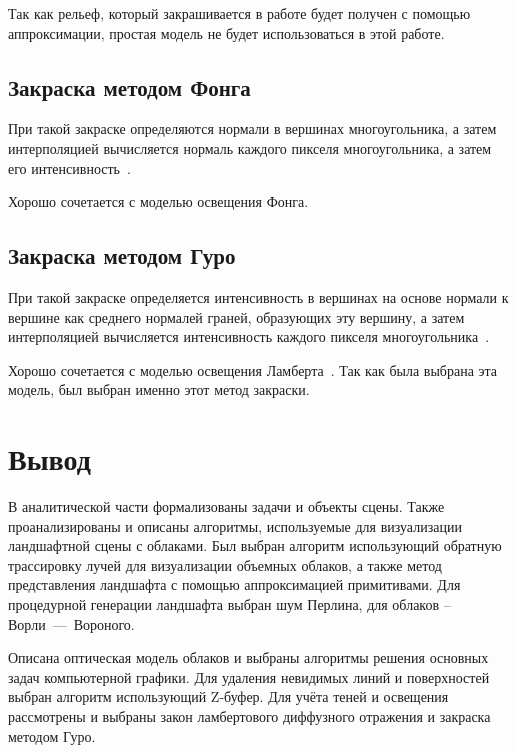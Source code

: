 Так как рельеф, который закрашивается в работе будет получен с помощью аппроксимации, простая модель не будет использоваться в этой работе.

\subsection{Закраска методом Фонга}
При такой закраске определяются нормали в вершинах многоугольника, а затем интерполяцией вычисляется нормаль каждого пикселя многоугольника, а затем его интенсивность~\cite{rodgers1989algorithms}.

Хорошо сочетается с моделью освещения Фонга.

\subsection{Закраска методом Гуро}
При такой закраске определяется интенсивность в вершинах на основе нормали к вершине как среднего нормалей граней, образующих эту вершину, а затем интерполяцией вычисляется интенсивность каждого пикселя многоугольника~\cite{rodgers1989algorithms}.

Хорошо сочетается с моделью освещения Ламберта~\cite{rodgers1989algorithms}. Так как была выбрана эта модель, был выбран именно этот метод закраски.

\section*{Вывод}
В аналитической части формализованы задачи и объекты сцены. Также проанализированы и описаны алгоритмы, используемые для визуализации ландшафтной сцены с облаками. 	
Был выбран алгоритм использующий обратную трассировку лучей для визуализации объемных облаков, а также метод представления ландшафта с помощью аппроксимацией примитивами. Для процедурной генерации ландшафта выбран шум Перлина, для облаков -- Ворли~---~Вороного.

Описана оптическая модель облаков и выбраны алгоритмы решения основных задач компьютерной графики. Для удаления невидимых линий и поверхностей выбран алгоритм использующий Z-буфер. Для учёта теней и освещения рассмотрены и выбраны закон ламбертового диффузного отражения и закраска методом Гуро.
